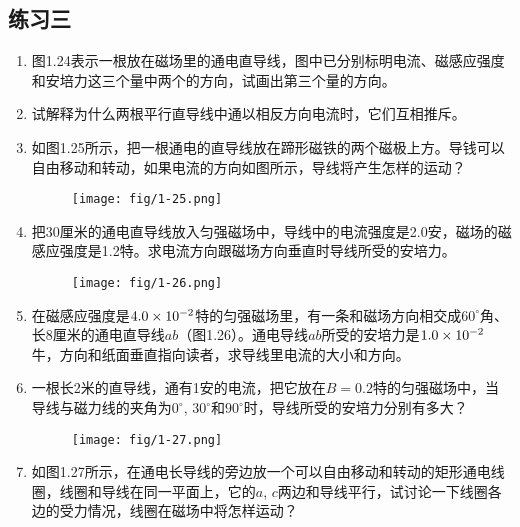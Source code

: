 \subsection*{练习三}
\begin{enumerate}
    \item 图1.24表示一根放在磁场里的通电直导线，图中已分别标明电流、磁感应强度和安培力这三个量中两个的方向，试画出第三个量的方向。
    \begin{figure}[htp]\centering
{}
    	\caption{ }
    \end{figure}
    \item 试解释为什么两根平行直导线中通以相反方向电流时，它们互相推斥。
    \item 如图1.25所示，把一根通电的直导线放在蹄形磁铁的两个磁极上方。导钱可以自由移动和转动，如果电流的方向如图所示，导线将产生怎样的运动？
        \begin{figure}[htp]\centering
    	\texttt{[image: fig/1-25.png]}
    	\caption{ }
    \end{figure}
    \item 把30厘米的通电直导线放入匀强磁场中，导线中的电流强度是2.0安，磁场的磁感应强度是1.2特。求电流方向跟磁场方向垂直时导线所受的安培力。
        \begin{figure}[htp]\centering
    	\texttt{[image: fig/1-26.png]}
    	\caption{ }
    \end{figure}
    \item 在磁感应强度是$4.0\times10^{-2}$特的匀强磁场里，有一条和磁场方向相交成$60^\circ$角、长8厘米的通电直导线$ab$（图1.26）。通电导线$ab$所受的安培力是$1.0\times10^{-2}$牛，方向和纸面垂直指向读者，求导线里电流的大小和方向。
    \item 一根长2米的直导线，通有1安的电流，把它放在$B=0.2$特的匀强磁场中，当导线与磁力线的夹角为$0^\circ$, $30^\circ$和$90^\circ$时，导线所受的安培力分别有多大？
        \begin{figure}[htp]\centering
    	\texttt{[image: fig/1-27.png]}
    	\caption{ }
    \end{figure}
    \item 如图1.27所示，在通电长导线的旁边放一个可以自由移动和转动的矩形通电线圈，线圈和导线在同一平面上，它的$a$, $c$两边和导线平行，试讨论一下线圈各边的受力情况，线圈在磁场中将怎样运动？
\end{enumerate}

